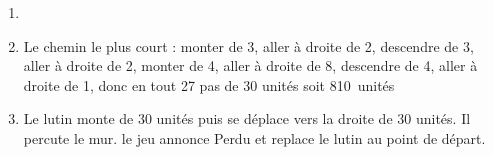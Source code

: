\documentclass[10pt]{article}
\begin{document}

\begin{enumerate}
	\item  %
	\begin{scratch}[scale=0.8]  \end{scratch} 
	
	\item %
Le chemin le plus court : monter de 3, aller à droite de 2, descendre de 3, aller à droite de 2, monter de 4, aller à droite de 8, descendre de 4, aller à droite de 1, donc en tout 27 pas de 30 unités soit 810~unités	
	\item %
Le lutin monte de 30 unités puis se déplace vers la droite de 30 unités. Il percute le mur. le jeu annonce \og Perdu \fg{} et replace le lutin au point de départ.
\end{enumerate}
\end{document}
